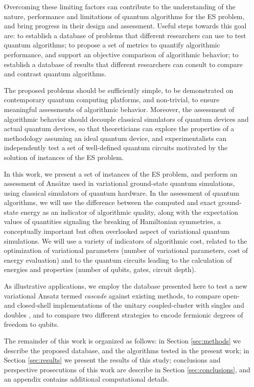 \documentclass[aps,pra,onecolumn]{revtex4-2}
\begin{document}
Overcoming these limiting factors can contribute to the understanding of the nature, performance and limitations of quantum algorithms for the ES problem, and bring progress in their design and assessment.
Useful steps towards this goal are:
to establish a database of problems that different researchers can use to test quantum algorithms;
to propose a set of metrics to quantify algorithmic performance, and support an objective comparison of algorithmic behavior;
to establish a database of results that different researchers can consult to compare and contrast quantum algorithms.

The proposed problems should be sufficiently simple, to be demonstrated on contemporary quantum computing platforms, and non-trivial, to ensure meaningful assessments of algorithmic behavior.
Moreover, the assessment of algorithmic behavior should decouple classical simulators of quantum devices and actual quantum devices,
so that theoreticians can explore the properties of a methodology assuming an ideal quantum device, and experimentalists can independently test a set of well-defined quantum circuits motivated by the solution of instances of the ES problem.
 
In this work, we present a set of instances of the ES problem, and perform an assessment of Ans\"{a}tze used in variational ground-state quantum simulations,
using classical simulators of quantum hardware.
In the assessment of quantum algorithms, we will use the difference between the computed and exact ground-state energy as an indicator of algorithmic quality,
along with the expectation values of quantities signaling the breaking of Hamiltonian symmetries, a conceptually important but often overlooked aspect of variational quantum simulations.
We will use a variety of indicators of algorithmic cost, related to the optimization of variational parameters (number of variational parameters, cost of energy evaluation)
and to the quantum circuits leading to the calculation of energies and properties (number of qubits, gates, circuit depth).

As illustrative applications, we employ the database presented here to test a new variational Ansatz termed {\em{cascade}} against existing methods,
to compare open- and closed-shell implementations of the unitary coupled-cluster with singles and doubles \cite{scuseria1987closed,szalay1997spin}, 
and to compare two different strategies to encode fermionic degrees of freedom to qubits.

The remainder of this work is organized as follows: 
in Section \ref{sec:methods} we describe the proposed database, and the algorithms tested in the present work;
in Section \ref{sec:results} we present the results of this study;
conclusions and perspective prosecutions of this work are describe in Section \ref{sec:conclusions},
and an appendix contains additional computational details.
\end{document}
